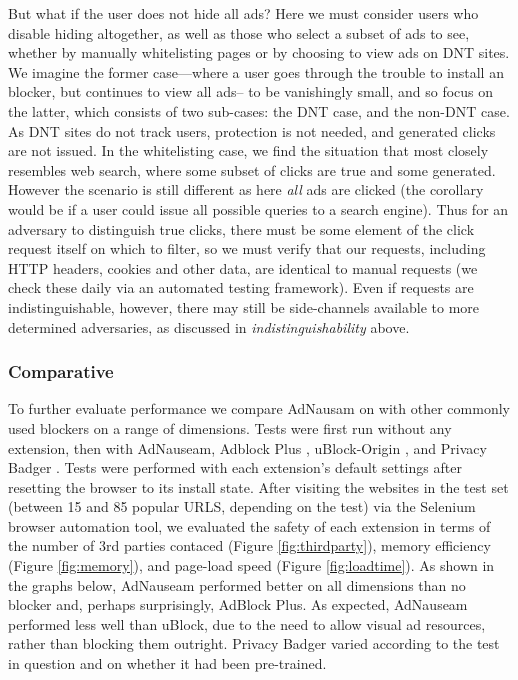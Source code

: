 \documentclass[conference]{IEEEtran}
\begin{document}
But what if the user does not hide all ads? Here we must consider users who disable hiding altogether, as well as those who select a subset of ads to see, whether by manually whitelisting pages or by choosing to view ads on DNT sites. We imagine the former case---where a user goes through the trouble to install an blocker, but continues to view all ads-- to be vanishingly small, and so focus on the latter, which consists of two sub-cases: the DNT case, and the non-DNT case. As DNT sites do not track users, protection is not needed, and generated clicks are not issued. In the whitelisting case, we find the situation that most closely resembles web search, where some subset of clicks are true and some generated. However the scenario is still different as here \emph{all} ads are clicked (the corollary would be if a user could issue all possible queries to a search engine). Thus for an adversary to distinguish true clicks, there must be some element of the click request itself on which to filter, so we must verify that our requests, including HTTP headers, cookies and other data, are identical to manual requests (we check these daily via an automated testing framework). Even if requests are indistinguishable, however, there may still be side-channels available to more determined adversaries, as discussed in \emph{indistinguishability} above.


\subsubsection{Comparative}

To further evaluate performance we compare AdNausam on with other commonly used blockers on a range of dimensions. Tests were first run without any extension, then with AdNauseam, Adblock Plus \cite{AdBlock}, uBlock-Origin \cite{Gorhill}, and Privacy Badger \cite{EFF-0}. Tests were performed with each extension's default settings after resetting the browser to its install state. After visiting the websites in the test set (between 15 and 85 popular URLS, depending on the test) via the Selenium browser automation tool, we evaluated the safety of each extension in terms of the number of 3rd parties contaced (Figure \ref{fig:thirdparty}), memory efficiency (Figure \ref{fig:memory}), and page-load speed (Figure \ref{fig:loadtime}). As shown in the graphs below, AdNauseam performed better on all dimensions than no blocker and, perhaps surprisingly, AdBlock Plus. As expected, AdNauseam performed less well than uBlock, due to the need to allow visual ad resources, rather than blocking them outright. Privacy Badger varied according to the test in question and on whether it had been pre-trained.
\end{document}
